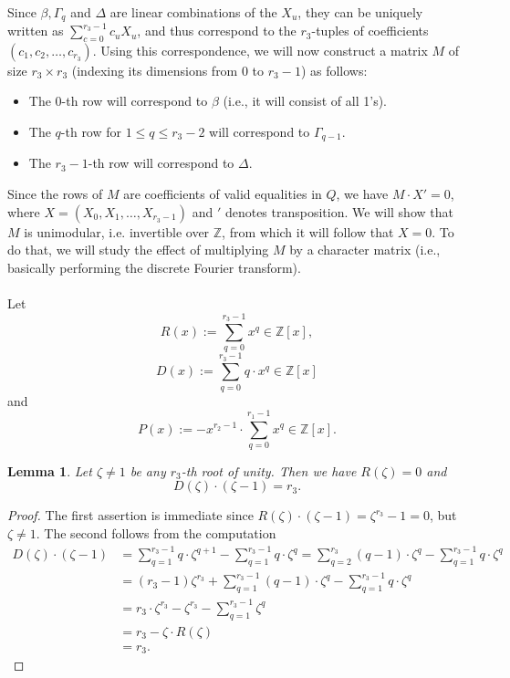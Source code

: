\documentclass[12pt,a4paper]{article}
\newtheorem{lemma}[theorem]{Lemma}
\theoremstyle{definition}
\newcommand{\Z}{\mathbb{Z}}
\begin{document}
\paragraph*{}
Since $\beta,\Gamma_q$ and $\Delta$ are linear combinations of the $X_u$, they can be uniquely written as $\sum_{c=0}^{r_3-1}c_uX_u$, and thus correspond to the $r_3$-tuples of coefficients $(c_1,c_2,\dots,c_{r_3})$. Using this correspondence, we will now construct a matrix $M$ of size $r_3\times r_3$ (indexing its dimensions from $0$ to $r_3-1$) as follows:
\begin{itemize}
\item The $0$-th row will correspond to $\beta$ (i.e., it will consist of all 1's).
\item The $q$-th row for $1\leq q\leq r_3-2$ will correspond to $\Gamma_{q-1}$.
\item The $r_3-1$-th row will correspond to $\Delta$.
\end{itemize}

Since the rows of $M$ are coefficients of valid equalities in $Q$, we have $M\cdot X'=0$, where $X=(X_0,X_1,\dots,X_{r_3-1})$ and $'$ denotes transposition. We will show that $M$ is unimodular, i.e. invertible over $\Z$, from which it will follow that $X=0$. To do that, we will study the effect of multiplying $M$ by a character matrix (i.e., basically performing the discrete Fourier transform).

\paragraph*{}
Let $$R(x):=\sum_{q=0}^{r_3-1} x^q\in\Z[x],$$
$$D(x):=\sum_{q=0}^{r_3-1}q\cdot x^q\in \Z[x]$$
and 
$$P(x):=-x^{r_2-1}\cdot \sum_{q=0}^{r_1-1} x^q\in \Z[x].$$

\begin{lemma}
Let $\zeta\neq 1$ be any $r_3$-th root of unity. Then we have $R(\zeta)=0$ and $$D(\zeta)\cdot(\zeta-1)=r_3.$$
\end{lemma}
\begin{proof}
The first assertion is immediate since $R(\zeta)\cdot(\zeta-1)=\zeta^{r_3}-1=0$, but $\zeta\neq 1$. The second follows from the computation
\begin{equation*}
\begin{split}
D(\zeta)\cdot(\zeta-1)&=\sum_{q=1}^{r_3-1} q\cdot \zeta^{q+1}-\sum_{q=1}^{r_3-1} q\cdot \zeta^q=\sum_{q=2}^{r_3} (q-1)\cdot \zeta^{q}-\sum_{q=1}^{r_3-1} q\cdot \zeta^q\\
&=(r_3-1)\zeta^{r_3}+\sum_{q=1}^{r_3-1} (q-1)\cdot \zeta^{q}-\sum_{q=1}^{r_3-1} q\cdot \zeta^q\\
&=r_3\cdot \zeta^{r_3}-\zeta^{r_3}-\sum_{q=1}^{r_3-1} \zeta^{q}\\
&=r_3-\zeta\cdot R(\zeta)\\
&=r_3.
\end{split}
\end{equation*}
\end{proof}
\end{document}
